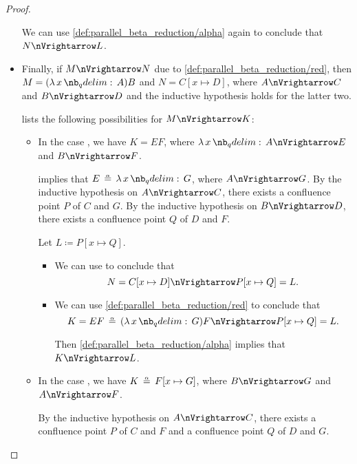 \begin{proof}
\begin{itemize}
    We can use \ref{def:parallel_beta_reduction/alpha} again to conclude that \( N \pred L \).

    \item Finally, if \( M \pred N \) due to \ref{def:parallel_beta_reduction/red}, then \( M = (\qabs x A)B \) and \( N = C[x \mapsto D] \), where \( A \pred C \) and \( B \pred D \) and the inductive hypothesis holds for the latter two.

     lists the following possibilities for \( M \pred K \):
    \begin{itemize}
      \item In the case , we have \( K = EF \), where \( \qabs x A \pred E \) and \( B \pred F \).

       implies that \( E \aequiv \qabs x G \), where \( A \pred G \). By the inductive hypothesis on \( A \pred C \), there exists a confluence point \( P \) of \( C \) and \( G \). By the inductive hypothesis on \( B \pred D \), there exists a confluence point \( Q \) of \( D \) and \( F \).

      Let \( L \coloneqq P[x \mapsto Q] \).
      \begin{itemize}
        \item We can use  to conclude that
        \begin{equation*}
          N = C[x \mapsto D] \pred P[x \mapsto Q] = L.
        \end{equation*}

        \item We can use \ref{def:parallel_beta_reduction/red} to conclude that
        \begin{equation*}
          K = EF \aequiv (\qabs x G) F \pred P[x \mapsto Q] = L.
        \end{equation*}

        Then \ref{def:parallel_beta_reduction/alpha} implies that \( K \pred L \).
      \end{itemize}

      \item In the case , we have \( K \aequiv F[x \mapsto G] \), where \( B \pred G \) and \( A \pred F \).

      By the inductive hypothesis on \( A \pred C \), there exists a confluence point \( P \) of \( C \) and \( F \) and a confluence point \( Q \) of \( D \) and \( G \).


\end{itemize}
\end{itemize}
\end{proof}
